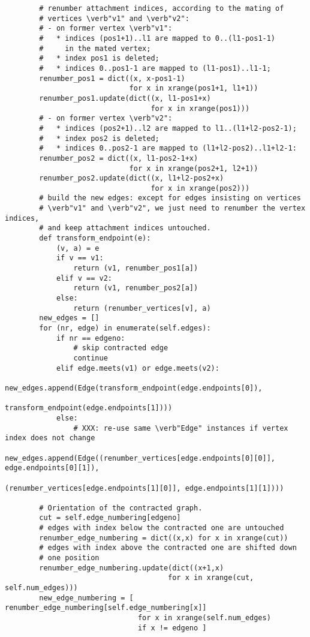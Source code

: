 \begin{lstlisting}
        # renumber attachment indices, according to the mating of
        # vertices \verb"v1" and \verb"v2":
        # - on former vertex \verb"v1":
        #   * indices (pos1+1)..l1 are mapped to 0..(l1-pos1-1)
        #     in the mated vertex;
        #   * index pos1 is deleted;
        #   * indices 0..pos1-1 are mapped to (l1-pos1)..l1-1;
        renumber_pos1 = dict((x, x-pos1-1)
                             for x in xrange(pos1+1, l1+1))
        renumber_pos1.update(dict((x, l1-pos1+x)
                                  for x in xrange(pos1)))
        # - on former vertex \verb"v2":
        #   * indices (pos2+1)..l2 are mapped to l1..(l1+l2-pos2-1);
        #   * index pos2 is deleted;
        #   * indices 0..pos2-1 are mapped to (l1+l2-pos2)..l1+l2-1:
        renumber_pos2 = dict((x, l1-pos2-1+x)
                             for x in xrange(pos2+1, l2+1))
        renumber_pos2.update(dict((x, l1+l2-pos2+x)
                                  for x in xrange(pos2)))
        # build the new edges: except for edges insisting on vertices
        # \verb"v1" and \verb"v2", we just need to renumber the vertex indices,
        # and keep attachment indices untouched.
        def transform_endpoint(e):
            (v, a) = e
            if v == v1:
                return (v1, renumber_pos1[a])
            elif v == v2:
                return (v1, renumber_pos2[a])
            else:
                return (renumber_vertices[v], a)
        new_edges = []
        for (nr, edge) in enumerate(self.edges):
            if nr == edgeno:
                # skip contracted edge
                continue
            elif edge.meets(v1) or edge.meets(v2):
                new_edges.append(Edge(transform_endpoint(edge.endpoints[0]),
                                      transform_endpoint(edge.endpoints[1])))
            else:
                # XXX: re-use same \verb"Edge" instances if vertex index does not change
                new_edges.append(Edge((renumber_vertices[edge.endpoints[0][0]], edge.endpoints[0][1]),
                                      (renumber_vertices[edge.endpoints[1][0]], edge.endpoints[1][1])))

        # Orientation of the contracted graph.
        cut = self.edge_numbering[edgeno]
        # edges with index below the contracted one are untouched
        renumber_edge_numbering = dict((x,x) for x in xrange(cut))
        # edges with index above the contracted one are shifted down
        # one position
        renumber_edge_numbering.update(dict((x+1,x)
                                      for x in xrange(cut, self.num_edges)))
        new_edge_numbering = [ renumber_edge_numbering[self.edge_numbering[x]]
                               for x in xrange(self.num_edges)
                               if x != edgeno ]
        

\end{lstlisting}
